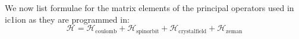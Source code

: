 %
%


We now list formulae for the matrix elements of the principal operators used in {\prg ic1ion} as
they are programmed in:
\begin{equation}
 \mathcal H = \mathcal H_{\mathrm{coulomb}} + \mathcal H_{\mathrm {spinorbit}} + \mathcal H_{\mathrm{crystalfield}} + \mathcal H_{\mathrm{zeman}}
\end{equation}

